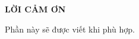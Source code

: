 \documentclass[../../../thesis]{subfiles}
\begin{document}
\begin{center}
    \textbf{\large
        LỜI CẢM ƠN
    }
\end{center}

Phần này sẽ được viết khi phù hợp.

\thispagestyle{empty}

\clearpage
\end{document}
